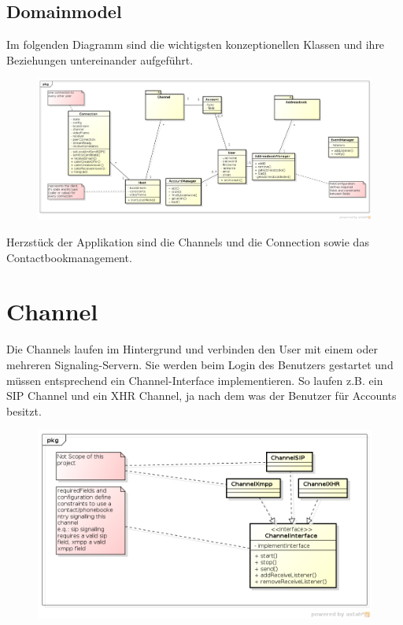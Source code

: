 \begin{landscape}
\section{Domainmodel}
	Im folgenden Diagramm sind die wichtigsten konzeptionellen Klassen und ihre Beziehungen untereinander aufgeführt.
	\begin{figure}[H]
		\centering
		\includegraphics[width=1.2\textwidth]{../architekturanalayse/img/domain.png}
	\end{figure}
	Herzstück der Applikation sind die Channels und die Connection sowie das Contactbookmanagement.

\end{landscape}

\section{Channel}
	Die Channels laufen im Hintergrund und verbinden den User mit einem oder mehreren Signaling-Servern. Sie werden beim Login des Benutzers gestartet und müssen entsprechend ein Channel-Interface implementieren. So laufen z.B. ein SIP Channel und ein XHR Channel, ja nach dem was der Benutzer für Accounts besitzt.
	\begin{figure}[H]
		\centering
		\includegraphics[width=\textwidth]{../architekturanalayse/img/channel.png}
	\end{figure}
	
